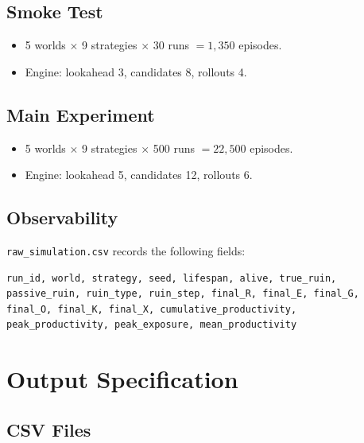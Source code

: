 \subsection{Smoke Test}
\begin{itemize}
\item 5 worlds $\times$ 9 strategies $\times$ 30 runs $= 1{,}350$
episodes.
\item Engine: lookahead 3, candidates 8, rollouts 4.
\end{itemize}

\subsection{Main Experiment}
\begin{itemize}
\item 5 worlds $\times$ 9 strategies $\times$ 500 runs $=
22{,}500$ episodes.
\item Engine: lookahead 5, candidates 12, rollouts 6.
\end{itemize}

\subsection{Observability}
\texttt{raw\_simulation.csv} records the following fields:

\begin{lstlisting}[basicstyle=\ttfamily\scriptsize,frame=single]
run_id, world, strategy, seed, lifespan, alive, true_ruin,
passive_ruin, ruin_type, ruin_step, final_R, final_E, final_G,
final_O, final_K, final_X, cumulative_productivity,
peak_productivity, peak_exposure, mean_productivity
\end{lstlisting}

\section{Output Specification}
\label{sec:vnext-outputs}

\subsection{CSV Files}

